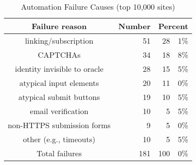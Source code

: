 
 \begin{table}[t]
 \begin{center}
 \begin{threeparttable}
 \begin{tabular}{|c|r|r@{.}l|}
 \hline
 \textbf{Failure reason} & \multicolumn{1}{|c|}{\textbf{Number}} & \multicolumn{2}{|c|}{\textbf{Percent}}\\
 \hline
 linking/subscription& 51 & 28 & 1\%\\
 \hline
 CAPTCHAs & 34 & 18 & 8\%\\
 \hline
 identity invisible to oracle & 28 & 15 & 5\%\\
 \hline
 atypical input elements & 20 & 11 & 0\%\\
 \hline
 atypical submit buttons & 19 & 10 & 5\%\\
 \hline
 email verification & 10 & 5 & 5\%\\
 \hline
 non-HTTPS submission forms & 9 & 5 & 0\%\\
 \hline
 other (e.g., timeouts) & 10 & 5 & 5\%\\
 \hline\hline
 Total failures & 181 & 100 &0\%\\
 \hline
 \end{tabular}
 \end{threeparttable}
 \end{center}
 \caption{Automation Failure Causes (top 10,000 sites)}
 \label{tab:ssoscanStudyFailureReasons}
 \end{table}
